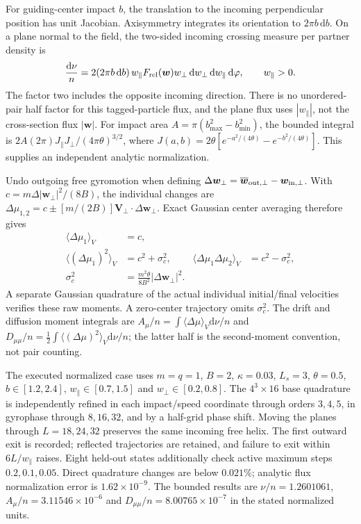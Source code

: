 \documentclass[11pt,letterpaper]{article}
\newcommand{\dd}{\mathrm d}
\begin{document}
For guiding-center impact $b$, the translation to the incoming perpendicular
position has unit Jacobian. Axisymmetry integrates its orientation to
$2\pi b\,\dd b$. On a plane normal to the field, the two-sided incoming
crossing measure per partner density is
\begin{equation}
 \frac{\dd\nu}{n}=2(2\pi b\,\dd b)\,w_\parallel F_{\rm rel}(\bm w)
 w_\perp\,\dd w_\perp\,\dd w_\parallel\,\dd\varphi,
 \qquad w_\parallel>0.
\end{equation}
The factor two includes the opposite incoming direction. There is no
unordered-pair half factor for this tagged-particle flux, and the plane flux
uses $|w_\parallel|$, not the cross-section flux $|\bm w|$.
For impact area $A=\pi(b_{\max}^2-b_{\min}^2)$, the bounded integral is
$2A(2\pi)J_\parallel J_\perp/(4\pi\theta)^{3/2}$, where
$J(a,b)=2\theta[e^{-a^2/(4\theta)}-e^{-b^2/(4\theta)}]$.
This supplies an independent analytic normalization.

Undo outgoing free gyromotion when defining
$\Delta\bm w_\perp=\overline{\bm w}_{\rm out,\perp}-\bm w_{\rm in,\perp}$.
With $c=m\Delta|\bm w_\perp|^2/(8B)$, the individual changes are
$\Delta\mu_{1,2}=c\pm[m/(2B)]\bm V_\perp\cdot\Delta\bm w_\perp$.
Exact Gaussian center averaging therefore gives
\begin{align}
 \langle\Delta\mu_1\rangle_V&=c,\\
 \langle(\Delta\mu_1)^2\rangle_V&=c^2+\sigma_c^2,
 &\langle\Delta\mu_1\Delta\mu_2\rangle_V&=c^2-\sigma_c^2,\\
 \sigma_c^2&=\frac{m^2\theta}{8B^2}|\Delta\bm w_\perp|^2.
\end{align}
A separate Gaussian quadrature of the actual individual initial/final
velocities verifies these raw moments. A zero-center trajectory omits
$\sigma_c^2$. The drift and diffusion moment integrals are
$A_\mu/n=\int\langle\Delta\mu\rangle_V\dd\nu/n$ and
$D_{\mu\mu}/n=\tfrac12\int\langle(\Delta\mu)^2\rangle_V\dd\nu/n$;
the latter half is the second-moment convention, not pair counting.

The executed normalized case uses $m=q=1$, $B=2$, $\kappa=0.03$, $L_s=3$,
$\theta=0.5$, $b\in[1.2,2.4]$, $w_\parallel\in[0.7,1.5]$ and
$w_\perp\in[0.2,0.8]$. The $4^3\times16$ base quadrature is independently
refined in each impact/speed coordinate through orders $3,4,5$, in gyrophase
through $8,16,32$, and by a half-grid phase shift. Moving the planes through
$L=18,24,32$ preserves the same incoming free helix. The first outward exit
is recorded; reflected trajectories are retained, and failure to exit within
$6L/w_\parallel$ raises. Eight held-out states additionally check active maximum
steps $0.2,0.1,0.05$. Direct quadrature changes are below $0.021\%$;
analytic flux normalization error is $1.62\times10^{-9}$.
The bounded results are $\nu/n=1.2601061$,
$A_\mu/n=3.11546\times10^{-6}$ and
$D_{\mu\mu}/n=8.00765\times10^{-7}$ in the stated normalized units.
\end{document}
